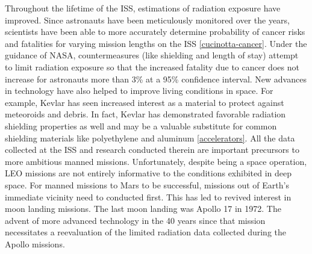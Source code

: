 Throughout the lifetime of the ISS, estimations of radiation exposure have improved. Since astronauts have been meticulously monitored over the years, scientists have been able to more accurately determine probability of cancer risks and fatalities for varying mission lengths on the ISS \ref{cucinotta-cancer}. Under the guidance of NASA, countermeasures (like shielding and length of stay) attempt to limit radiation exposure so that the increased fatality due to cancer does not increase for astronauts more than 3\% at a 95\% confidence interval. New advances in technology have also helped to improve living conditions in space. For example, Kevlar has seen increased interest as a material to protect against meteoroids and debris. In fact, Kevlar has demonstrated favorable radiation shielding properties as well and may be a valuable substitute for common shielding materials like polyethylene and aluminum \ref{accelerators}. All the data collected at the ISS and research conducted therein are important precursors to more ambitious manned missions. Unfortunately, despite being a space operation, LEO missions are not entirely informative to the conditions exhibited in deep space. For manned missions to Mars to be successful, missions out of Earth’s immediate vicinity need to conducted first. This has led to revived interest in moon landing missions. The last moon landing was Apollo 17 in 1972. The advent of more advanced technology in the 40 years since that mission necessitates a reevaluation of the limited radiation data collected during the Apollo missions.
